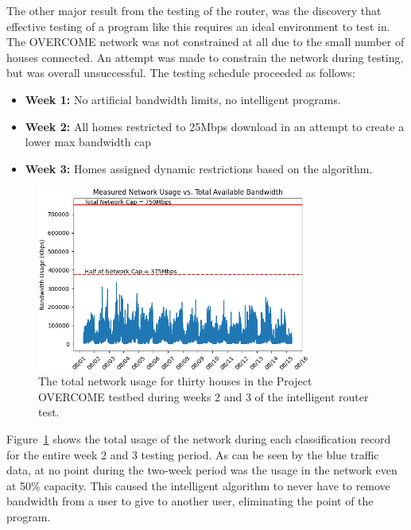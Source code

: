 The other major result from the testing of the router, was the discovery that effective testing of a program like this requires an ideal environment to test in.
The OVERCOME network was not constrained at all due to the small number of houses connected.
An attempt was made to constrain the network during testing, but was overall unsuccessful.
The testing schedule proceeded as follows:
\begin{itemize}
    \item \textbf{Week 1:} No artificial bandwidth limits, no intelligent programs.
    \item \textbf{Week 2:} All homes restricted to 25Mbps download in an attempt to create a lower max bandwidth cap
    \item \textbf{Week 3:} Homes assigned dynamic restrictions based on the algorithm.
\end{itemize}
\begin{figure}[!ht]
    \centering
    \includegraphics[width=0.8\textwidth,keepaspectratio]{Images/Chpt4/Network_Usage.png}
    \caption{The total network usage for thirty houses in the Project OVERCOME testbed during weeks 2 and 3 of the intelligent router test.}
    \label{max_usage}
\end{figure}
Figure~\ref{max_usage} shows the total usage of the network during each classification record for the entire week 2 and 3 testing period.
As can be seen by the blue traffic data, at no point during the two-week period was the usage in the network even at 50\% capacity.
This caused the intelligent algorithm to never have to remove bandwidth from a user to give to another user, eliminating the point of the program.
